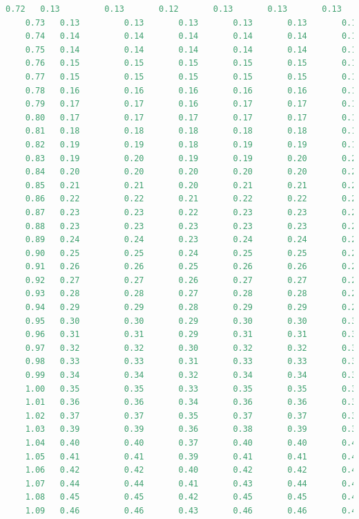 \documentclass[12pt]{report}
\begin{document}
\begin{lstlisting}[language=Python]
	0.72   0.13         0.13       0.12       0.13       0.13       0.13
	0.73   0.13         0.13       0.13       0.13       0.13       0.13
	0.74   0.14         0.14       0.14       0.14       0.14       0.14
	0.75   0.14         0.14       0.14       0.14       0.14       0.14
	0.76   0.15         0.15       0.15       0.15       0.15       0.15
	0.77   0.15         0.15       0.15       0.15       0.15       0.15
	0.78   0.16         0.16       0.16       0.16       0.16       0.16
	0.79   0.17         0.17       0.16       0.17       0.17       0.17
	0.80   0.17         0.17       0.17       0.17       0.17       0.17
	0.81   0.18         0.18       0.18       0.18       0.18       0.18
	0.82   0.19         0.19       0.18       0.19       0.19       0.19
	0.83   0.19         0.20       0.19       0.19       0.20       0.20
	0.84   0.20         0.20       0.20       0.20       0.20       0.20
	0.85   0.21         0.21       0.20       0.21       0.21       0.21
	0.86   0.22         0.22       0.21       0.22       0.22       0.22
	0.87   0.23         0.23       0.22       0.23       0.23       0.23
	0.88   0.23         0.23       0.23       0.23       0.23       0.23
	0.89   0.24         0.24       0.23       0.24       0.24       0.24
	0.90   0.25         0.25       0.24       0.25       0.25       0.25
	0.91   0.26         0.26       0.25       0.26       0.26       0.26
	0.92   0.27         0.27       0.26       0.27       0.27       0.27
	0.93   0.28         0.28       0.27       0.28       0.28       0.28
	0.94   0.29         0.29       0.28       0.29       0.29       0.29
	0.95   0.30         0.30       0.29       0.30       0.30       0.30
	0.96   0.31         0.31       0.29       0.31       0.31       0.31
	0.97   0.32         0.32       0.30       0.32       0.32       0.32
	0.98   0.33         0.33       0.31       0.33       0.33       0.33
	0.99   0.34         0.34       0.32       0.34       0.34       0.34
	1.00   0.35         0.35       0.33       0.35       0.35       0.35
	1.01   0.36         0.36       0.34       0.36       0.36       0.36
	1.02   0.37         0.37       0.35       0.37       0.37       0.37
	1.03   0.39         0.39       0.36       0.38       0.39       0.39
	1.04   0.40         0.40       0.37       0.40       0.40       0.40
	1.05   0.41         0.41       0.39       0.41       0.41       0.41
	1.06   0.42         0.42       0.40       0.42       0.42       0.42
	1.07   0.44         0.44       0.41       0.43       0.44       0.44
	1.08   0.45         0.45       0.42       0.45       0.45       0.45
	1.09   0.46         0.46       0.43       0.46       0.46       0.46

\end{lstlisting}
\end{document}
